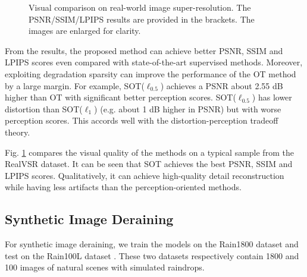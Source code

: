 \documentclass[10pt,journal,compsoc]{IEEEtran}
\begin{document}
\begin{figure}[!t]
	\centering
	\caption{Visual comparison on real-world image super-resolution. The PSNR/SSIM/LPIPS results are provided in the brackets. The images are enlarged for clarity.}
	\label{figure3}
\end{figure}


From the results, the proposed method can achieve better 
PSNR, SSIM and LPIPS scores even compared with state-of-the-art 
supervised methods. Moreover, exploiting degradation sparsity 
can improve the performance of the OT method by a large margin.
For example, SOT($\ell_{0.5}$) achieves a PSNR about 2.55 dB higher than OT
with significant better perception scores.
SOT($\ell_{0.5}$) has lower distortion than SOT($\ell_{1}$) 
(e.g. about 1 dB higher in PSNR) but with worse perception scores.
This  accords well with the distortion-perception tradeoff theory.

Fig. \ref{figure3} compares the visual quality of the 
methods on a typical sample from the RealVSR dataset. 
It can be seen that SOT achieves the best 
PSNR, SSIM and LPIPS scores. Qualitatively, 
it can achieve high-quality detail reconstruction
while having less artifacts than the perception-oriented methods.

\subsection{Synthetic Image Deraining}

For synthetic image deraining, we train the models on 
the Rain1800 dataset \cite{zhang2019image} and test on 
the Rain100L dataset \cite{yang2017deep}. These two datasets 
respectively contain 1800 and 100 images of natural scenes 
with simulated raindrops.
\end{document}
